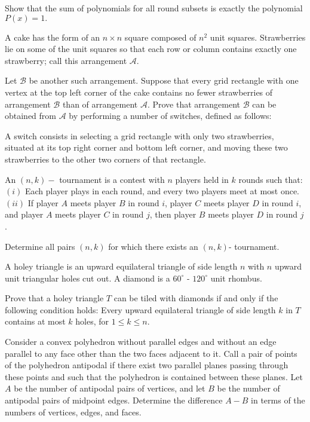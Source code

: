 Show that the sum of polynomials for all round subsets is exactly the polynomial 
$ P(x) = 1.$

\item[\textbf{C4.}]
A cake has the form of an 
$ n \times n$
 square composed of 
$ n^{2}$
 unit squares. Strawberries lie on some of the unit squares so that each row or column contains exactly one strawberry; call this arrangement 
$\mathcal{A}$.

Let 
$\mathcal{B}$
 be another such arrangement. Suppose that every grid rectangle with one vertex at the top left corner of the cake contains no fewer strawberries of arrangement 
$\mathcal{B}$
 than of arrangement 
$\mathcal{A}$.
 Prove that arrangement 
$\mathcal{B}$
 can be obtained from 
$ \mathcal{A}$
 by performing a number of switches, defined as follows:


A switch consists in selecting a grid rectangle with only two strawberries, situated at its top right corner and bottom left corner, and moving these two strawberries to the other two corners of that rectangle.

\item[\textbf{C5.}]
An 
$ (n, k) -$
 tournament is a contest with 
$ n$
 players held in 
$ k$
 rounds such that:
$ (i)$
 Each player plays in each round, and every two players meet at most once.
$ (ii)$
 If player 
$ A$
 meets player 
$ B$
 in round 
$ i$, 
 player 
$ C$
 meets player 
$ D$
 in round 
$ i$, 
 and player 
$ A$
 meets player 
$ C$
 in round 
$ j$, 
 then player 
$ B$
 meets player 
$ D$
 in round 
$ j$.


Determine all pairs 
$ (n, k)$
 for which there exists an 
$ (n, k)$-
 tournament.

\item[\textbf{C6.}]
A holey triangle is an upward equilateral triangle of side length 
$n$
 with 
$n$
 upward unit triangular holes cut out. A diamond is a 
$60^\circ$ - $120^\circ$
 unit rhombus.

Prove that a holey triangle 
$T$
can be tiled with diamonds if and only if the following condition holds: Every upward equilateral triangle of side length 
$k$
 in 
$T$
 contains at most 
$k$
 holes, for 
$1\leq k\leq n$.

\item[\textbf{C7.}]
Consider a convex polyhedron without parallel edges and without an edge parallel to any face other than the two faces adjacent to it. Call a pair of points of the polyhedron 
antipodal
 if there exist two parallel planes passing through these points and such that the polyhedron is contained between these planes. Let 
$A$
 be the number of antipodal pairs of vertices, and let 
$B$
 be the number of antipodal pairs of midpoint edges. Determine the difference 
$A-B$
 in terms of the numbers of vertices, edges, and faces.